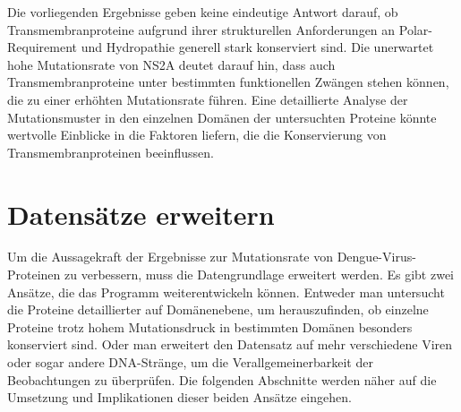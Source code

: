 \documentclass[german,version-2022-01]{uzl-thesis}
\begin{document}
Die vorliegenden Ergebnisse geben keine eindeutige Antwort darauf, ob Transmembranproteine aufgrund ihrer strukturellen Anforderungen an Polar-Requirement und Hydropathie generell stark konserviert sind. Die unerwartet hohe Mutationsrate von NS2A deutet darauf hin, dass auch Transmembranproteine unter bestimmten funktionellen Zw\"angen stehen k\"onnen, die zu einer erh\"ohten Mutationsrate f\"uhren. Eine detaillierte Analyse der Mutationsmuster in den einzelnen Dom\"anen der untersuchten Proteine k\"onnte wertvolle Einblicke in die Faktoren liefern, die die Konservierung von Transmembranproteinen beeinflussen.

\section{Datens\"atze erweitern}
Um die Aussagekraft der Ergebnisse zur Mutationsrate von Dengue-Virus-Proteinen zu verbessern, muss die Datengrundlage erweitert werden. Es gibt zwei Ans\"atze, die das Programm weiterentwickeln k\"onnen. Entweder man untersucht die Proteine detaillierter auf Dom\"anenebene, um herauszufinden, ob einzelne Proteine trotz hohem Mutationsdruck in bestimmten Dom\"anen besonders konserviert sind. Oder man erweitert den Datensatz auf mehr verschiedene Viren oder sogar andere DNA-Str\"ange, um die Verallgemeinerbarkeit der Beobachtungen zu \"uberpr\"ufen. Die folgenden Abschnitte werden n\"aher auf die Umsetzung und Implikationen dieser beiden Ans\"atze eingehen.
\end{document}
